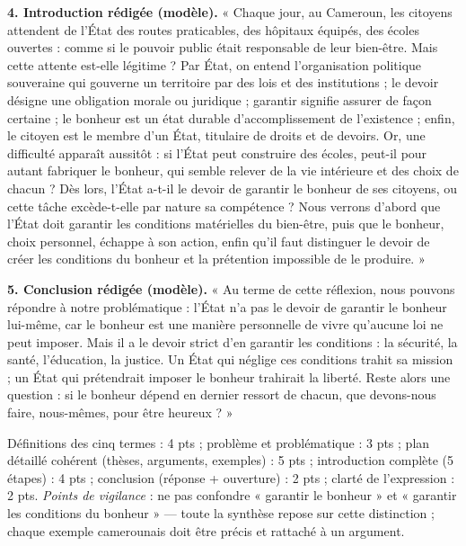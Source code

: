\documentclass[11pt]{article}
\begin{document}
\begin{corrige}
\textbf{4. Introduction rédigée (modèle).}
« Chaque jour, au Cameroun, les citoyens attendent de l'État des routes praticables, des hôpitaux équipés, des écoles ouvertes : comme si le pouvoir public était responsable de leur bien-être. Mais cette attente est-elle légitime ? Par État, on entend l'organisation politique souveraine qui gouverne un territoire par des lois et des institutions ; le devoir désigne une obligation morale ou juridique ; garantir signifie assurer de façon certaine ; le bonheur est un état durable d'accomplissement de l'existence ; enfin, le citoyen est le membre d'un État, titulaire de droits et de devoirs. Or, une difficulté apparaît aussitôt : si l'État peut construire des écoles, peut-il pour autant fabriquer le bonheur, qui semble relever de la vie intérieure et des choix de chacun ? Dès lors, l'État a-t-il le devoir de garantir le bonheur de ses citoyens, ou cette tâche excède-t-elle par nature sa compétence ? Nous verrons d'abord que l'État doit garantir les conditions matérielles du bien-être, puis que le bonheur, choix personnel, échappe à son action, enfin qu'il faut distinguer le devoir de créer les conditions du bonheur et la prétention impossible de le produire. »

\textbf{5. Conclusion rédigée (modèle).}
« Au terme de cette réflexion, nous pouvons répondre à notre problématique : l'État n'a pas le devoir de garantir le bonheur lui-même, car le bonheur est une manière personnelle de vivre qu'aucune loi ne peut imposer. Mais il a le devoir strict d'en garantir les conditions : la sécurité, la santé, l'éducation, la justice. Un État qui néglige ces conditions trahit sa mission ; un État qui prétendrait imposer le bonheur trahirait la liberté. Reste alors une question : si le bonheur dépend en dernier ressort de chacun, que devons-nous faire, nous-mêmes, pour être heureux ? »

\begin{attention}
Définitions des cinq termes : 4 pts ; problème et problématique : 3 pts ; plan détaillé cohérent (thèses, arguments, exemples) : 5 pts ; introduction complète (5 étapes) : 4 pts ; conclusion (réponse + ouverture) : 2 pts ; clarté de l'expression : 2 pts. \emph{Points de vigilance} : ne pas confondre « garantir le bonheur » et « garantir les conditions du bonheur » — toute la synthèse repose sur cette distinction ; chaque exemple camerounais doit être précis et rattaché à un argument.
\end{attention}
\end{corrige}
\end{document}
